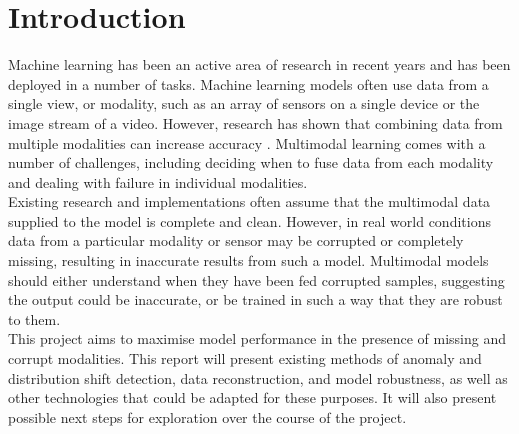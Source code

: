 \chapter{Introduction}
Machine learning has been an active area of research in recent years and has been deployed in a number of tasks. Machine learning models often use data from a single view, or modality, such as an array of sensors on a single device or the image stream of a video. However, research has shown that combining data from multiple modalities can increase accuracy \cite{AVmultimodal,FusionSurvey, AVEC2011}. Multimodal learning comes with a number of challenges, including deciding when to fuse data from each modality and dealing with failure in individual modalities.\\

Existing research and implementations often assume that the multimodal data supplied to the model is complete and clean. However, in real world conditions data from a particular modality or sensor may be corrupted or completely missing, resulting in inaccurate results from such a model. Multimodal models should either understand when they have been fed corrupted samples, suggesting the output could be inaccurate, or be trained in such a way that they are robust to them.\\ 

This project aims to maximise model performance in the presence of missing and corrupt modalities. This report will present existing methods of anomaly and distribution shift detection, data reconstruction, and model robustness, as well as other technologies that could be adapted for these purposes. It will also present possible next steps for exploration over the course of the project.\\
